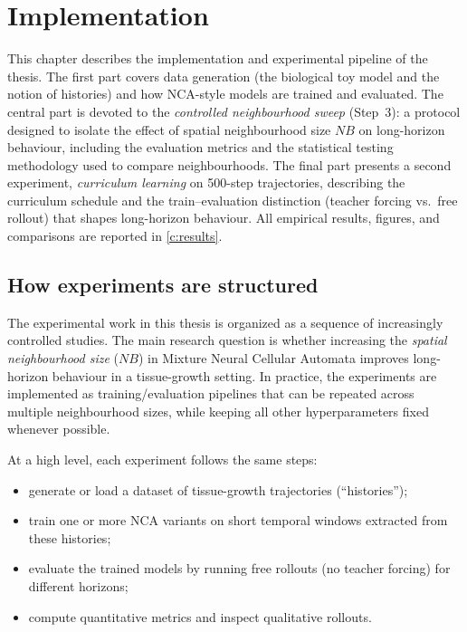 \chapter{Implementation}
\label{c:implementation}

This chapter describes the implementation and experimental pipeline of the thesis.
The first part covers data generation (the biological toy model and the notion of histories) and how NCA-style models are trained and evaluated.
The central part is devoted to the \emph{controlled neighbourhood sweep} (Step~3): a protocol designed to isolate the effect of spatial neighbourhood size \(NB\) on long-horizon behaviour, including the evaluation metrics and the statistical testing methodology used to compare neighbourhoods.
The final part presents a second experiment, \emph{curriculum learning} on 500-step trajectories, describing the curriculum schedule and the train--evaluation distinction (teacher forcing vs.\ free rollout) that shapes long-horizon behaviour.
All empirical results, figures, and comparisons are reported in \cref{c:results}.

\section{How experiments are structured}

The experimental work in this thesis is organized as a sequence of increasingly controlled studies.
The main research question is whether increasing the \emph{spatial neighbourhood size} (\(NB\)) in Mixture Neural Cellular Automata improves long-horizon behaviour in a tissue-growth setting.
In practice, the experiments are implemented as training/evaluation pipelines that can be repeated across multiple neighbourhood sizes, while keeping all other hyperparameters fixed whenever possible.

At a high level, each experiment follows the same steps:
\begin{itemize}
\item generate or load a dataset of tissue-growth trajectories (``histories'');
\item train one or more NCA variants on short temporal windows extracted from these histories;
\item evaluate the trained models by running free rollouts (no teacher forcing) for different horizons;
\item compute quantitative metrics and inspect qualitative rollouts.
\end{itemize}

